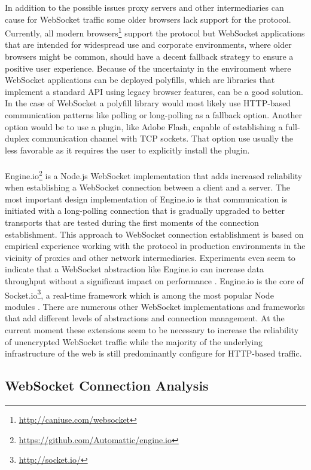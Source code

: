 In addition to the possible issues proxy servers and other intermediaries can cause for WebSocket traffic some older browsers lack support for the protocol. Currently, all modern browsers\footnote{\url{http://caniuse.com/websocket}} support the protocol but WebSocket applications that are intended for widespread use and corporate environments, where older browsers might be common, should have a decent fallback strategy to ensure a positive user experience. Because of the uncertainty in the environment where WebSocket applications can be deployed polyfills, which are libraries that implement a standard API using legacy browser features, can be a good solution. In the case of WebSocket a polyfill library would most likely use HTTP-based communication patterns like polling or long-polling as a fallback option. Another option would be to use a plugin, like Adobe Flash, capable of establishing a full-duplex communication channel with TCP sockets. That option use usually the less favorable as it requires the user to explicitly install the plugin.
\\ \\
Engine.io\footnote{\url{https://github.com/Automattic/engine.io}} is a Node.js WebSocket implementation that adds increased reliability when establishing a WebSocket connection between a client and a server. The most important design implementation of Engine.io is that communication is initiated with a long-polling connection that is gradually upgraded to better transports that are tested during the first moments of the connection establishment. This approach to WebSocket connection establishment is based on empirical experience working with the protocol in production environments in the vicinity of proxies and other network intermediaries. Experiments even seem to indicate that a WebSocket abstraction like Engine.io can increase data throughput without a significant impact on performance \cite{ozger2014websocket}. Engine.io is the core of Socket.io\footnote{\url{http://socket.io/}}, a real-time framework which is among the most popular Node modules \cite{npmStarred}. There are numerous other WebSocket implementations and frameworks that add different levels of abstractions and connection management. At the current moment these extensions seem to be necessary to increase the reliability of unencrypted WebSocket traffic while the majority of the underlying infrastructure of the web is still predominantly configure for HTTP-based traffic.

\subsection{WebSocket Connection Analysis}

